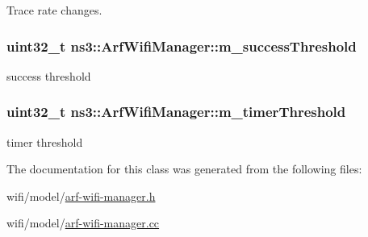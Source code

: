 Trace rate changes. 

\subsubsection[{\texorpdfstring{m\+\_\+success\+Threshold}{m_successThreshold}}]{\setlength{\rightskip}{0pt plus 5cm}uint32\+\_\+t ns3\+::\+Arf\+Wifi\+Manager\+::m\+\_\+success\+Threshold\hspace{0.3cm}{\ttfamily [private]}}\hypertarget{classns3_1_1ArfWifiManager_a6ec0b16b55aa4c35686b4ab5bd61240d}{}\label{classns3_1_1ArfWifiManager_a6ec0b16b55aa4c35686b4ab5bd61240d}


success threshold 

\subsubsection[{\texorpdfstring{m\+\_\+timer\+Threshold}{m_timerThreshold}}]{\setlength{\rightskip}{0pt plus 5cm}uint32\+\_\+t ns3\+::\+Arf\+Wifi\+Manager\+::m\+\_\+timer\+Threshold\hspace{0.3cm}{\ttfamily [private]}}\hypertarget{classns3_1_1ArfWifiManager_ab5925d5bdf91969c526dc9dd00dc0856}{}\label{classns3_1_1ArfWifiManager_ab5925d5bdf91969c526dc9dd00dc0856}


timer threshold 



The documentation for this class was generated from the following files\+:\begin{DoxyCompactItemize}
\item 
wifi/model/\hyperlink{arf-wifi-manager_8h}{arf-\/wifi-\/manager.\+h}\item 
wifi/model/\hyperlink{arf-wifi-manager_8cc}{arf-\/wifi-\/manager.\+cc}\end{DoxyCompactItemize}
